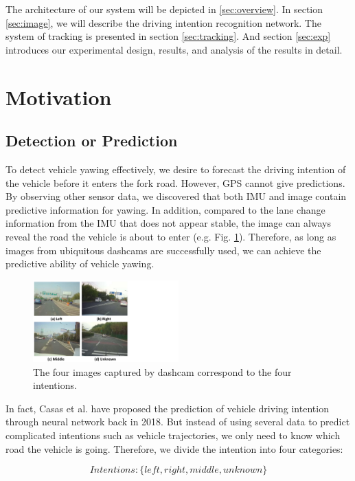 \documentclass[journal]{IEEEtran}
\begin{document}
The architecture of our system will be depicted in \ref{sec:overview}.
In section \ref{sec:image}, we will describe the driving intention recognition network.
The system of tracking is presented in section \ref{sec:tracking}.
And section \ref{sec:exp} introduces our experimental design, results, and analysis of the results in detail.

\section{Motivation}

\subsection{Detection or Prediction}
To detect vehicle yawing effectively, we desire to forecast the driving intention of the vehicle before it enters the fork road. However, GPS cannot give predictions. By observing other sensor data, we discovered that both IMU and image contain predictive information for yawing. In addition, compared to the lane change information from the IMU that does not appear stable, the image can always reveal the road the vehicle is about to enter (e.g. Fig. \ref{fig:intent}). Therefore, as long as images from ubiquitous dashcams are successfully used, we can achieve the predictive ability of vehicle yawing.

\begin{figure}[htbp]
    \centerline{\includegraphics[width=0.5\textwidth]{fig/intention.pdf}}
    \caption{The four images captured by dashcam correspond to the four intentions. }
    \label{fig:intent}
\end{figure}

In fact, Casas et al. \cite{casas2018intentnet} have proposed the prediction of vehicle driving intention through neural network back in 2018. But instead of using several data to predict complicated intentions such as vehicle trajectories, we only need to know which road the vehicle is going. Therefore, we divide the intention into four categories: 

    $$Intentions: \{ left, right, middle, unknown\}$$
\end{document}
